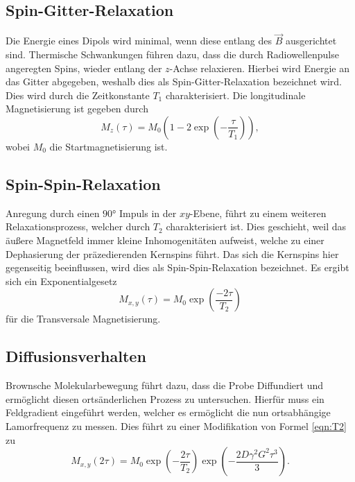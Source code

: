 \subsection{Spin-Gitter-Relaxation}
Die Energie eines Dipols wird minimal, wenn diese entlang des $\vec{B}$ ausgerichtet sind. Thermische Schwankungen führen dazu, dass die durch Radiowellenpulse angeregten Spins, wieder entlang der $z$-Achse relaxieren. Hierbei wird Energie an das Gitter abgegeben, weshalb dies als Spin-Gitter-Relaxation bezeichnet wird. Dies wird durch die Zeitkonstante $T_1$ charakterisiert.
Die longitudinale Magnetisierung ist gegeben durch
\begin{equation}
    M_{z} (\tau) = M_0 \left( 1- 2 \exp(-\frac{\tau}{T_1} ) \right) ,
\end{equation}
wobei $M_0$ die Startmagnetisierung ist.
\subsection{Spin-Spin-Relaxation}
Anregung durch einen $90°$ Impuls in der $xy$-Ebene, führt zu einem weiteren Relaxationsprozess, welcher durch $T_2$ charakterisiert ist.
Dies geschieht, weil das äußere Magnetfeld immer kleine Inhomogenitäten aufweist, welche zu einer Dephasierung der präzedierenden Kernspins führt.
Das sich die Kernspins hier gegenseitig beeinflussen, wird dies als Spin-Spin-Relaxation bezeichnet.
Es ergibt sich ein Exponentialgesetz 
\begin{equation}
    \label{eqn:T2}
    M_{x,y}(\tau) = M_0 \exp\left(\frac{-2\tau}{T_2} \right) 
\end{equation}
für die Transversale Magnetisierung.
\subsection{Diffusionsverhalten}
Brownsche Molekularbewegung führt dazu, dass die Probe Diffundiert und ermöglicht diesen ortsänderlichen Prozess zu untersuchen.
Hierfür muss ein Feldgradient eingeführt werden, welcher es ermöglicht die nun ortsabhängige  Lamorfrequenz zu messen. 
Dies führt zu einer Modifikation von Formel \ref{eqn:T2} zu
\begin{equation}
    M_{x,y}(2\tau) = M_0 \exp\left(-\frac{2\tau}{T_2}\right) \exp \left(-\frac{2D\gamma^2 G^2 \tau^3}{3}\right).
\end{equation}